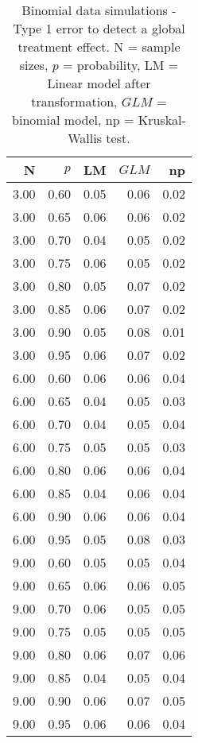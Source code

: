 \begin{table}[H]
\centering
\caption{Binomial data simulations - Type 1 error to detect a global treatment effect. N = sample sizes, 
             $p$ = probability, LM = Linear model after transformation, 
             $GLM$ = binomial model, np = Kruskal-Wallis test.} 
\label{tab:t1_glob_p}
{\footnotesize
\begin{tabular}{rrrrr}
  \hline
N & $p$ & LM & $GLM$ & np \\ 
  \hline
3.00 & 0.60 & 0.05 & 0.06 & 0.02 \\ 
  3.00 & 0.65 & 0.06 & 0.06 & 0.02 \\ 
  3.00 & 0.70 & 0.04 & 0.05 & 0.02 \\ 
  3.00 & 0.75 & 0.06 & 0.05 & 0.02 \\ 
  3.00 & 0.80 & 0.05 & 0.07 & 0.02 \\ 
  3.00 & 0.85 & 0.06 & 0.07 & 0.02 \\ 
  3.00 & 0.90 & 0.05 & 0.08 & 0.01 \\ 
  3.00 & 0.95 & 0.06 & 0.07 & 0.02 \\ 
  6.00 & 0.60 & 0.06 & 0.06 & 0.04 \\ 
  6.00 & 0.65 & 0.04 & 0.05 & 0.03 \\ 
  6.00 & 0.70 & 0.04 & 0.05 & 0.04 \\ 
  6.00 & 0.75 & 0.05 & 0.05 & 0.03 \\ 
  6.00 & 0.80 & 0.06 & 0.06 & 0.04 \\ 
  6.00 & 0.85 & 0.04 & 0.06 & 0.04 \\ 
  6.00 & 0.90 & 0.06 & 0.06 & 0.04 \\ 
  6.00 & 0.95 & 0.05 & 0.08 & 0.03 \\ 
  9.00 & 0.60 & 0.05 & 0.05 & 0.04 \\ 
  9.00 & 0.65 & 0.06 & 0.06 & 0.05 \\ 
  9.00 & 0.70 & 0.06 & 0.05 & 0.05 \\ 
  9.00 & 0.75 & 0.05 & 0.05 & 0.05 \\ 
  9.00 & 0.80 & 0.06 & 0.07 & 0.06 \\ 
  9.00 & 0.85 & 0.04 & 0.05 & 0.04 \\ 
  9.00 & 0.90 & 0.06 & 0.07 & 0.05 \\ 
  9.00 & 0.95 & 0.06 & 0.06 & 0.04 \\ 
   \hline
\end{tabular}
}
\end{table}
